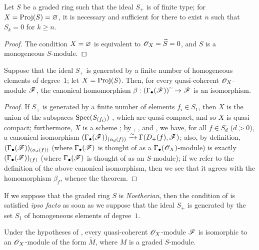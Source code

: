 \begin{corollary}[2.7.4]
\label{II.2.7.4}
Let $S$ be a graded ring such that the ideal $S_+$ is of finite type;
for $X=\operatorname{Proj}(S)=\varnothing$, it is necessary and sufficient for there to exist $n$ such that $S_k=0$ for $k\geq n$.
\end{corollary}

\begin{proof}
The condition $X=\varnothing$ is equivalent to $\mathscr{O}_X=\widetilde{S}=0$, and $S$ is a monogeneous $S$-module.
\end{proof}

\begin{theorem}[2.7.5]
\label{II.2.7.5}
Suppose that the ideal $S_+$ is generated by a finite number of homogeneous elements of degree~$1$;
let $X=\operatorname{Proj}(S)$.
Then, for every quasi-coherent $\mathscr{O}_X$-module $\mathscr{F}$, the canonical homomorphism $\beta:(\Gamma_\bullet(\sh{F}))\supertilde\to\sh{F}$  is an isomorphism.
\end{theorem}

\begin{proof}
If $S_+$ is generated by a finite number of elements $f_i\in S_1$, then $X$ is the union of the subspaces $\operatorname{Spec}(S_{(f_i)})$ , which are quasi-compact, and so $X$ is quasi-compact;
furthermore, $X$ is a scheme ;
by , , and , we have, for all $f\in S_d$ ($d>0$), a canonical isomorphism $(\Gamma_\bullet(\mathscr{F}))_{(\alpha_d(f))}\xrightarrow{\sim}\Gamma(D_+(f),\mathscr{F})$;
also, by definition, $(\Gamma_\bullet(\mathscr{F}))_{(\alpha_d(f))}$ (where $\Gamma_\bullet(\mathscr{F})$ is thought of as a $\Gamma_\bullet(\mathscr{O}_X)$-module) is exactly $(\Gamma_\bullet(\mathscr{F}))_{(f)}$ (where $\Gamma_\bullet(\mathscr{F})$ is thought of as an $S$-module);
if we refer to the definition  of the above canonical isomorphism, then we see that it agrees with the homomorphism $\beta_f$, whence the theorem.
\end{proof}

\begin{remark}[2.7.6]
\label{II.2.7.6}
If we suppose that the graded ring $S$ is \emph{Noetherian}, then the condition of  is satisfied \emph{ipso facto} as soon as we suppose that the ideal $S_+$ is generated by the set $S_1$ of homogeneous elements of degree~$1$.
\end{remark}

\begin{corollary}[2.7.7]
\label{II.2.7.7}
Under the hypotheses of , every quasi-coherent $\mathscr{O}_X$-module $\mathscr{F}$ is isomorphic to an $\mathscr{O}_X$-module of the form $\widetilde{M}$, where $M$ is a graded $S$-module.
\end{corollary}

